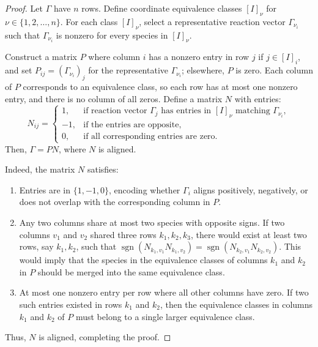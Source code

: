 \documentclass{article}
\begin{document}
\begin{proof}
Let \( \Gamma \) have \( n \) rows. Define coordinate equivalence classes \( [I]_{\nu} \) for \( \nu \in \{1,2,\dots,n\} \). For each class \( [I]_{\nu} \), select a representative reaction vector \( \Gamma_{\nu_i} \) such that \( \Gamma_{\nu_i} \) is nonzero for every species in \( [I]_{\nu} \).

Construct a matrix \( P \) where column \( i \) has a nonzero entry in row \( j \) if \( j \in [I]_i \), and set \( P_{ij} = (\Gamma_{\nu_i})_j \) for the representative \( \Gamma_{\nu_i} \); elsewhere, \( P \) is zero. Each column of \( P \) corresponds to an equivalence class, so each row has at most one nonzero entry, and there is no column of all zeros. Define a matrix \( N \) with entries:
\[
N_{ij} =
\begin{cases}
    1, & \text{if reaction vector } \Gamma_j \text{ has entries in } [I]_\nu \text{ matching } \Gamma_{\nu_i}, \\
   -1, & \text{if the entries are opposite}, \\
    0, & \text{if all corresponding entries are zero}.
\end{cases}
\]
Then, \( \Gamma = PN \), where \( N \) is aligned.

Indeed, the matrix \( N \) satisfies:
\begin{enumerate}
    \item Entries are in \( \{1,-1,0\} \), encoding whether \( \Gamma_i \) aligns positively, negatively, or does not overlap with the corresponding column in \( P \).
    \item Any two columns share at most two species with opposite signs. If two columns \( v_1 \) and \( v_2 \) shared three rows \( k_1, k_2, k_3 \), there would exist at least two rows, say \( k_1, k_2 \), such that \( \operatorname{sgn} (N_{k_1,v_1} N_{k_1,v_2}) = \operatorname{sgn} (N_{k_2,v_1} N_{k_2,v_2}) \). This would imply that the species in the equivalence classes of columns \( k_1 \) and \( k_2 \) in \( P \) should be merged into the same equivalence class.
    \item At most one nonzero entry per row where all other columns have zero. If two such entries existed in rows \( k_1 \) and \( k_2 \), then the equivalence classes in columns \( k_1 \) and \( k_2 \) of \( P \) must belong to a single larger equivalence class.
\end{enumerate}
Thus, \( N \) is aligned, completing the proof.
\end{proof}
\end{document}
